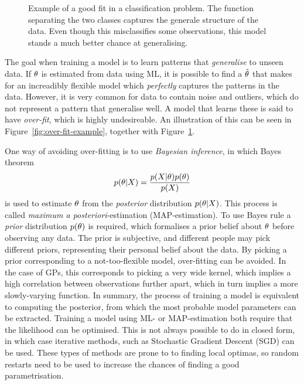 \begin{figure}
\begin{minipage}{.46\textwidth}
    \caption{Example of a good fit in a classification problem. The
      function separating the two classes captures the generale structure of the
      data. Even though this misclassifies some observations, this
      model stands a much better chance at generalising.}\label{fig:good-fit-example}
  \end{minipage}
\end{figure}

The goal when training a model is to learn patterns that
\textit{generalise} to unseen data. If $\theta$ is estimated
from data using ML, it is possible to find a $\hat{\theta}$ that
makes for an increadibly flexible model which \textit{perfectly}
captures the patterns in the data. However, it is very common for data
to contain noise and outliers, which do not represent a pattern that
generalise well. A model that learns these is said to have
\textit{over-fit}, which is highly undesireable. An illustration of
this can be seen in Figure~\ref{fig:over-fit-example}, together with Figure~\ref{fig:good-fit-example}.

One way of avoiding over-fitting is to use \textit{Bayesian inference}, in which 
Bayes theorem
\begin{equation}
  \label{eq:bayes}
  p(\theta \vert X) = \frac{p(X \vert \theta) p(\theta)}{p(X)}
\end{equation}
is used to estimate $\theta$ from the \textit{posterior} distribution $p(\theta \vert X)$.
This process is called \textit{maximum a posteriori}-estimation (MAP-estimation). To use Bayes
rule a \textit{prior} distribution $p(\theta)$ is required, which formalises
a prior belief about $\theta$ before observing any data. The prior is
subjective, and different people may pick different priors,
representing their personal belief about the data. By picking a
prior corresponding to a not-too-flexible model, over-fitting can be
avoided. In the case of GPs, this corresponds to picking a very wide
kernel, which implies a high correlation between observations further
apart, which in turn implies a more slowly-varying function.
In summary, the process of training a model is equivalent to computing
the posterior, from which the most probable model parameters can be
extracted. Training a model using ML- or MAP-estimation both require that the
likelihood can be optimised. This is not always possible to do in
closed form, in which case iterative methods, such as Stochastic
Gradient Descent (SGD) can be used. These types of methods are
prone to to finding local optimas, so random restarts need to be used
to increase the chances of finding a good parametrisation.

